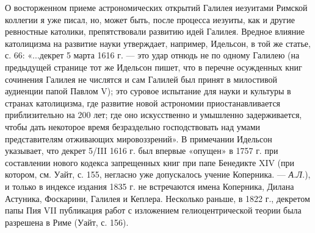 О  восторженном  приеме  астрономических  открытий  Галилея  иезуитами
Римской коллегии я уже писал,  но, может быть, после процесса иезуиты,
как  и  другие  ревностные   католики,  препятствовали  развитию  идей
Галилея.  Вредное влияние  католицизма на  развитие науки  утверждает,
например, Идельсон, в той же статье, с. 66: «...декрет 5 марта 1616 г.
--- это удар  отнюдь не по одному Галилею (на  предыдущей странице тот
же Идельсон пишет, что в  перечне осужденных книг сочинения Галилея не
числятся и сам Галилей был  принят в милостивой аудиенции папой Павлом
V); это суровое испытание для  науки и культуры в странах католицизма,
где развитие новой астрономии приостанавливается приблизительно на 200
лет;  где  оно  искусственно  и умышленно  задерживается,  чтобы  дать
некоторое время  безраздельно господствовать над  умами представителям
отживающих мировоззрений». В примечании Идельсон указывает, что декрет
5/III  1616  г.  был  впервые  «опущен»  в  1757  г.  при  составлении
нового кодекса запрещенных  книг при папе Бенедикте  XIV (при котором,
см.  Уайт, с.  155,  негласно уже  допускалось  учение Коперника.  ---
\emph{А.Л.}), и только в индексе  издания 1835 г. не встречаются имена
Коперника, Дилана  Астуника, Фоскарини,  Галилея и  Кеплера. Несколько
раньше, в 1822 г., декретом папы Пия VII публикация работ с изложением
гелиоцентрической теории была разрешена в Риме (Уайт, с. 156).

